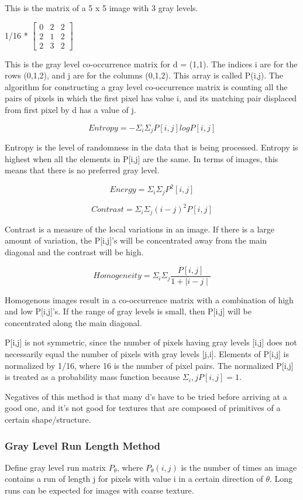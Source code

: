 \documentclass{article}
\begin{document}
\begin{multicols}{2}
This is the matrix of a 5 x 5 image with 3 gray levels.

1/16 * 
\(
  \begin{bmatrix}
    0 & 2 & 2\\
    2 & 1 & 2\\
    2 & 3 & 2
  \end{bmatrix}
  \)
  
  This is the gray level co-occurrence matrix for d = (1,1). The indices i are for the rows (0,1,2), and j are for the columns (0,1,2). This array is called P(i,j).
  The algorithm for constructing a gray level co-occurrence matrix is counting all the pairs of pixels in which the first pixel has value i, and its matching pair displaced from first pixel by d has a value of j.

  \[Entropy = -\Sigma_i \Sigma_j P[i,j]logP[i,j]\]

  Entropy is the level of randomness in the data that is being processed. Entropy is highest when all the elements in P[i,j] are the same. In terms of images, this means that there is no preferred gray level.
  
  \[Energy = \Sigma_i \Sigma_j P^2[i,j]\]

  \[Contrast = \Sigma_i \Sigma_j (i-j)^2 P[i,j]\]

  Contrast is a measure of the local variations in an image. If there is a large amount of variation,
  the P[i,j]'s will be concentrated away from the main diagonal and the contrast will be high.

  \[Homogeneity = \Sigma_i \Sigma_j \!\frac{P[i,j]}{1+\mid i-j \mid}\]

  Homogenous images result in a co-occurrence matrix with a combination of high and low P[i,j]'s. If the range of gray levels is small, then P[i,j] will be concentrated along the main diagonal.

  P[i,j] is not symmetric, since the number of pixels having gray levels [i,j] does not necessarily equal the number of pixels with gray levels [j,i].
  Elements of P[i,j] is normalized by 1/16, where 16 is the number of pixel pairs.
  The normalized P[i,j] is treated as a probability mass function because $\Sigma_i,j P[i,j] = 1$.

  Negatives of this method is that many d's have to be tried before arriving at a good one, and it's not good for textures that are composed of primitives of a certain shape/structure.

\subsubsection{Gray Level Run Length Method}
Define gray level run matrix $P_\theta$, where $P_\theta(i,j)$ is the number of times an image contains a run of length j for pixels with value i in a certain direction of $\theta$.
Long runs can be expected for images with coarse texture.


\end{multicols}
\end{document}
